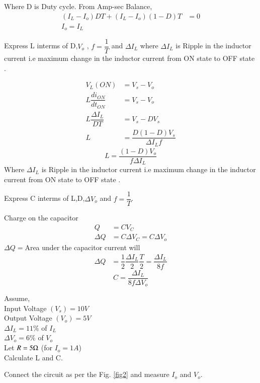 \documentclass[journal,12pt,twocolumn]{IEEEtran}
\begin{document}
Where D is Duty cycle.
From Amp-sec Balance,
\begin{align*}
  (I_{L} - I_{o})D T+(I_{L}-I_{o})(1-D)T &= 0 \\
  I_{o} = I_{L}
\end{align*} 
\begin{problem}
Express L interms of D,$V_{o}$ , $f=\dfrac{1}{T}$ and $\Delta I_{L}$ where $\Delta I_{L}$ is Ripple in the inductor  current i.e maximum change in the inductor current from ON state to OFF state . 
\end{problem}
\solution
\begin{align*}
  V_{L}(ON) &= V_{s} - V_{o}\\
  L \dfrac{di_{ON}}{dt_{ON}} &=V_{s} - V_{o}\\
  L \dfrac{\Delta I_{L}}{DT} &=V_{s} - DV_{s}\\
  L &=\dfrac{D(1-D)V_{s}}{\Delta I_{L}f}
  \end{align*}
\begin{equation}
\label{eq:eq1}
L=\dfrac{(1-D)V_{o}}{f\Delta I_{L}}
\end{equation}
Where $\Delta I_{L}$ is Ripple in the inductor  current i.e maximum change in the inductor current from ON state to OFF state . 
\begin{problem}
Express C interms of L,D,$\Delta V_{o}$ and $f=\dfrac{1}{T}$.
\end{problem}
\solution
Charge on the capacitor 
\begin{align*}
  Q&=CV_{C}\\
  \Delta Q &= C\Delta V_{C} =C\Delta V_{o}
\end{align*}
$\Delta Q=$Area under the capacitor current will
\begin{align*}
 \Delta Q &= \dfrac{1}{2}  \dfrac{\Delta I_{L}}{2} \dfrac{T}{2} =  \dfrac{\Delta I_{L}}{8f}
\end{align*}
\begin{equation}
\label{eq:eq2}
C=\dfrac{\Delta I_{L}}{8f\Delta V_{o}}  
\end{equation}
\begin{problem}
Assume,\\
Input Voltage $(V_{s}) = 10V$\\
Output Voltage $(V_{o}) = 5V$\\
$\Delta I_{L} = 11 \% $ of $I_{L}$\\
$\Delta V_{o} = 6 \% $ of $V_{o}$ \\
Let $R = 5 \ohm $ (for $I_{o}=1A$)\\
Calculate L and C.
\end{problem} 
\begin{problem}
Connect the circuit as per the Fig. \ref{fig2} and measure $I_{o}$ and $V_{o}$.
\end{problem}
\end{document}
